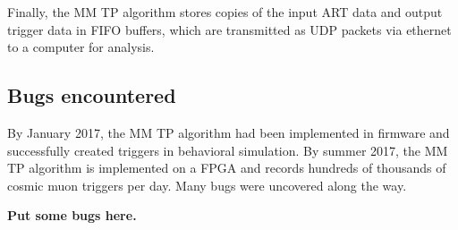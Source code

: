 Finally, the MM TP algorithm stores copies of the input ART data and output trigger data in FIFO buffers, which are transmitted as UDP packets via ethernet to a computer for analysis.

\subsection{Bugs encountered}
\label{sec:alg-bugs}

By January 2017, the MM TP algorithm had been implemented in firmware and successfully created triggers in behavioral simulation. By summer 2017, the MM TP algorithm is implemented on a FPGA and records hundreds of thousands of cosmic muon triggers per day. Many bugs were uncovered along the way.

\textbf{Put some bugs here.}

